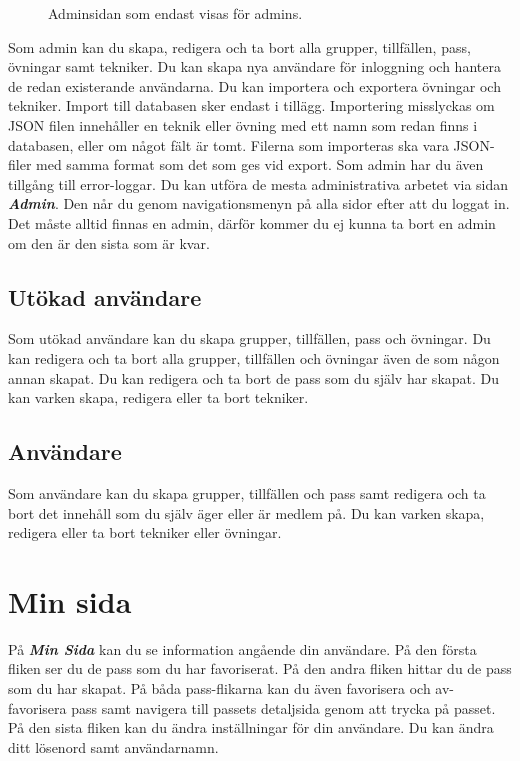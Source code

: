 \documentclass{article}
\newcommand{\term}[1]{\textcolor{secondary}{\textit{\textbf{#1}}}}
\newcommand{\button}[1]{{\tcbox{\textcolor{detail}{#1}}}}
\begin{document}
{\begin{figure}
            \caption{Adminsidan som endast visas för admins.}
            \label{fig:admin}
        \end{figure}
        Som admin kan du skapa, redigera och ta bort alla grupper, tillfällen, pass, övningar samt tekniker. Du kan skapa nya användare för inloggning och hantera de redan existerande användarna. Du kan importera och exportera övningar och tekniker. Import till databasen sker endast i tillägg. Importering misslyckas om JSON filen innehåller en teknik eller övning med ett namn som redan finns i databasen, eller om något fält är tomt. Filerna som importeras ska vara JSON-filer med samma format som det som ges vid export. Som admin har du även tillgång till error-loggar. Du kan utföra de mesta administrativa arbetet via sidan \term{Admin}. Den når du genom navigationsmenyn på alla sidor efter att du loggat in. Det måste alltid finnas en admin, därför kommer du ej kunna ta bort en admin om den är den sista som är kvar.

    \subsection{Utökad användare}
        Som utökad användare kan du skapa grupper, tillfällen, pass och övningar. Du kan redigera och ta bort alla grupper, tillfällen och övningar även de som någon annan skapat. Du kan redigera och ta bort de pass som du själv har skapat. Du kan varken skapa, redigera eller ta bort tekniker.

    \subsection{Användare}
        Som användare kan du skapa grupper, tillfällen och pass samt redigera och ta bort det innehåll som du själv äger eller är medlem på. Du kan varken skapa, redigera eller ta bort tekniker eller övningar.

\newpage
\section{Min sida}
    På \term{Min Sida} kan du se information angående din användare. På den första fliken \button{Favoritpass} ser du de pass som du har favoriserat. På den andra fliken \button{Mina Pass} hittar du de pass som du har skapat. På båda pass-flikarna kan du även favorisera och av-favorisera pass samt navigera till passets detaljsida genom att trycka på passet. På den sista fliken \button{Inställningar} kan du ändra inställningar för din användare. Du kan ändra ditt lösenord samt användarnamn.

}
\end{document}
